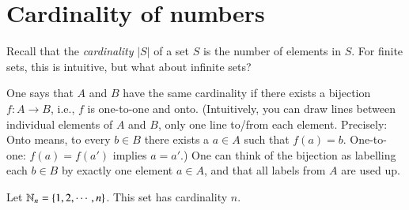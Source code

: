 \documentclass[12pt]{report}
\begin{document}
\section{Cardinality of numbers}

Recall that the \emph{cardinality} $|S|$ of a set $S$ is the number of elements in $S$. For finite sets, this is intuitive, but what about infinite sets?

One says that $A$ and $B$ have the same cardinality if there exists a bijection $f : A \to B$, i.e., $f$ is one-to-one and onto. (Intuitively, you can draw lines between individual elements of $A$ and $B$, only one line to/from each element. Precisely: Onto means, to every $b \in B$ there exists a $a \in A$ such that $f(a) = b$. One-to-one: $f(a)=f(a')$ implies $a=a'$.) One can think of the bijection as labelling each $b\in B$ by exactly one element $a\in A$, and that all labels from $A$ are used up. 

Let $\mathbb{N}_n = \{1, 2, \cdots, n\}$. This set has cardinality $n$. 
\end{document}
